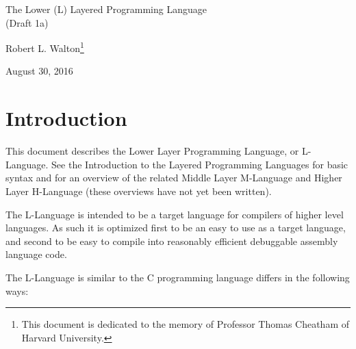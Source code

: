 \documentclass[12pt]{article}
\makeatletter
\renewcommand\tableofcontents{%
    \begin{list}{}%
	     {\setlength{\itemsep}{0in}%
	      \setlength{\topsep}{0in}%
	      \setlength{\parsep}{1ex}%
	      \setlength{\labelwidth}{0in}%
	      \setlength{\baselineskip}{1.5ex}%
	      \setlength{\leftmargin}{1.0in}%
	      \setlength{\rightmargin}{1.0in}}%
    \item\@starttoc{toc}%
    \end{list}}
\makeatother
\begin{document}
        
\begin{center}

{\Large
The Lower (L) Layered Programming Language \\[0.5ex]
(Draft 1a)}

\medskip

Robert L. Walton\footnote{This document is dedicated to the memory
of Professor Thomas Cheatham of Harvard University.}

August 30, 2016
 
\end{center}

{\small \tableofcontents}

\newpage

\section{Introduction}

This document describes the Lower Layer Programming Language, or
L-Language.  See the Introduction to the Layered
Programming Languages for basic syntax and for an overview of the related
Middle Layer M-Language and Higher Layer H-Language (these overviews
have not yet been written).

The L-Language is intended to be a target language for compilers of
higher level languages.  As such it is optimized first to be an easy to 
use as a target language, and second to be easy to
compile into reasonably efficient debuggable assembly language code.

The L-Language is similar to the C programming language
differs in the following ways:
\end{document}
